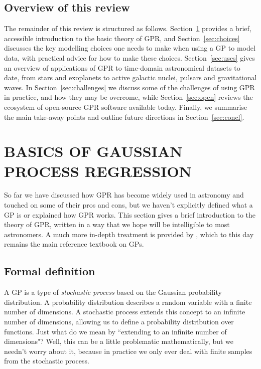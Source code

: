 \documentclass[letterpaper]{ar-1col}
\begin{document}
\subsection{Overview of this review}

The remainder of this review is structured as follows. Section~\ref{sec:basics} provides a brief, accessible introduction to the basic theory of GPR, and Section~\ref{sec:choices} discusses the key modelling choices one needs to make when using a GP to model data, with practical advice for how to make these choices. Section~\ref{sec:uses} gives an overview of applications of GPR to time-domain astronomical datasets to date, from stars and exoplanets to active galactic nuclei, pulsars and gravitational waves. In Section~\ref{sec:challenges} we discuss some of the challenges of using GPR in practice, and how they may be overcome, while Section~\ref{sec:open} reviews the ecosystem of open-source GPR software available today. Finally, we summarise the main take-away points and outline future directions in Section~\ref{sec:concl}.


\section{BASICS OF GAUSSIAN PROCESS REGRESSION}
\label{sec:basics}


So far we have discussed how GPR has become widely used in astronomy and touched on some of their pros and cons, but we haven't explicitly defined what a GP is or explained how GPR works. This section gives a brief introduction to the theory of GPR, written in a way that we hope will be intelligible to most astronomers. A much more in-depth treatment is provided by \citet{gpml}, which to this day remains the main reference textbook on GPs.

\subsection{Formal definition}
\label{sec:def}

A GP is a type of \textit{stochastic process} based on the Gaussian probability distribution. A probability distribution describes a random variable with a finite number of dimensions. A stochastic process extends this concept to an infinite number of dimensions, allowing us to define a probability distribution over functions. Just what do we mean by ``extending to an infinite number of dimensions"? Well, this can be a little problematic mathematically, but we needn't worry about it, because in practice we only ever deal with finite samples from the stochastic process.
\end{document}
